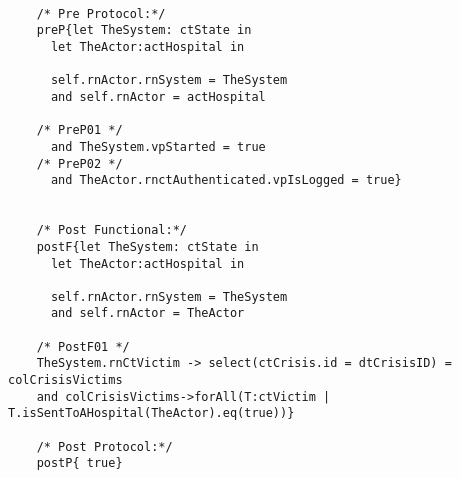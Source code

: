 	\scriptsize
	\vspace{0.5cm}
	\begin{lstlisting}[style=MessirStyle,firstnumber=auto,captionpos=b,caption={\msrmessir (MCL-oriented) specification of the operation \emph{oeGetHospitalVictimSet}.},label=OM-actHospital-oeGetHospitalVictimSet-MCL-LST]

	/* Pre Protocol:*/ 
	preP{let TheSystem: ctState in
	  let TheActor:actHospital in
	  
	  self.rnActor.rnSystem = TheSystem
	  and self.rnActor = actHospital
	  
	/* PreP01 */
	  and TheSystem.vpStarted = true
	/* PreP02 */
	  and TheActor.rnctAuthenticated.vpIsLogged = true}
	
	
	/* Post Functional:*/ 
	postF{let TheSystem: ctState in
	  let TheActor:actHospital in
	  
	  self.rnActor.rnSystem = TheSystem
	  and self.rnActor = TheActor
	  
	/* PostF01 */
	TheSystem.rnCtVictim -> select(ctCrisis.id = dtCrisisID) = colCrisisVictims
	and colCrisisVictims->forAll(T:ctVictim | T.isSentToAHospital(TheActor).eq(true))}
	
	/* Post Protocol:*/ 
	postP{ true}
	
	\end{lstlisting}
	\normalsize 
	
	
	
	






